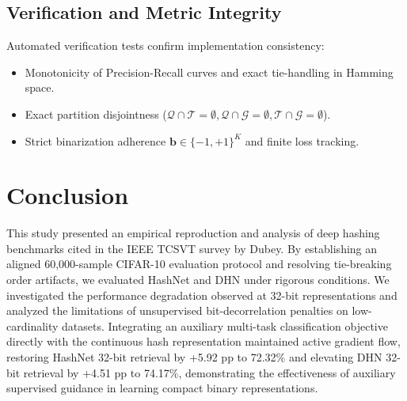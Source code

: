 \documentclass[10pt,conference]{IEEEtran}
\begin{document}
\subsection{Verification and Metric Integrity}
Automated verification tests confirm implementation consistency:
\begin{itemize}
    \item Monotonicity of Precision-Recall curves and exact tie-handling in Hamming space.
    \item Exact partition disjointness ($\mathcal{Q} \cap \mathcal{T} = \emptyset, \mathcal{Q} \cap \mathcal{G} = \emptyset, \mathcal{T} \cap \mathcal{G} = \emptyset$).
    \item Strict binarization adherence $\mathbf{b} \in \{-1, +1\}^K$ and finite loss tracking.
\end{itemize}

\section{Conclusion}
This study presented an empirical reproduction and analysis of deep hashing benchmarks cited in the IEEE TCSVT survey by Dubey. By establishing an aligned 60,000-sample CIFAR-10 evaluation protocol and resolving tie-breaking order artifacts, we evaluated HashNet and DHN under rigorous conditions. We investigated the performance degradation observed at 32-bit representations and analyzed the limitations of unsupervised bit-decorrelation penalties on low-cardinality datasets. Integrating an auxiliary multi-task classification objective directly with the continuous hash representation maintained active gradient flow, restoring HashNet 32-bit retrieval by +5.92 pp to 72.32\% and elevating DHN 32-bit retrieval by +4.51 pp to 74.17\%, demonstrating the effectiveness of auxiliary supervised guidance in learning compact binary representations.
\end{document}
